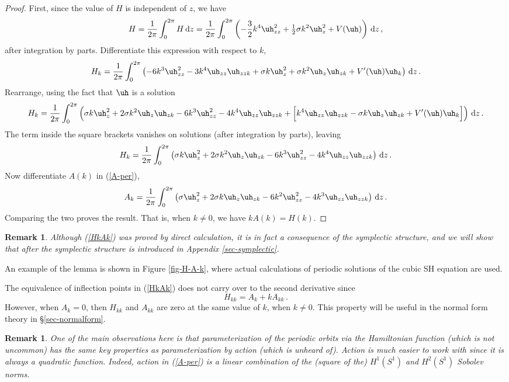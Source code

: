\documentclass[10pt]{article}
\newtheorem{rmk}[thm]{Remark}
\def\rd{{\rm d}} \def\re{{\rm e}} \def\fr{\mbox{$\frac{1}{2}$}}
\begin{document}
\begin{proof}
    First, since the value of $H$ is independent of $z$, we have
%
\begin{equation}\label{Hk-per}
H = \frac{1}{2\pi}\int_0^{2\pi} H\,\rd z =
\frac{1}{2\pi}\int_0^{2\pi} \left( -\frac{3}{2}k^4\uh_{zz}^2+
\fr\sigma k^2 \uh_{z}^2 + V(\uh)\right)\,\rd z \,,
\end{equation}
%
after integration by parts. Differentiate this expression with respect to $k$,
\[
H_k =
\frac{1}{2\pi}\int_0^{2\pi} \left( - 6k^3\uh_{zz}^2
-3k^4\uh_{zz}\uh_{zzk} +\sigma k \uh_{z}^2
+\sigma k^2 \uh_{z}\uh_{zk}+ V'(\uh)\uh_k\right)\,\rd z \,.
\]
Rearrange, using the fact that $\uh$ is a solution
\[
H_k =
\frac{1}{2\pi}\int_0^{2\pi} \left(\sigma k \uh_z^2
+2\sigma k^2 \uh_z\uh_{zk} - 6k^3\uh_{zz}^2 -4k^4\uh_{zz}\uh_{zzk}
+ \Big[k^4 \uh_{zz}\uh_{zzk}- \sigma k \uh_z\uh_{zk}
+ V'(\uh)\uh_k\Big]\right)\,\rd z \,.
\]
The term inside the square brackets vanishes on solutions (after integration by
parts), leaving
\[
H_k =
\frac{1}{2\pi}\int_0^{2\pi} \left(\sigma k \uh_z^2
+2\sigma k^2 \uh_z\uh_{zk} - 6k^3\uh_{zz}^2 -4k^4\uh_{zz}\uh_{zzk}
\right)\,\rd z\,.
\]
Now differentiate $A(k)$ in (\ref{A-per}),
\[
A_k = \frac{1}{2\pi}\int_0^{2\pi}\left(
\sigma \uh_z^2 + 2\sigma k \uh_z\uh_{zk} -6k^2\uh_{zz}^2 - 4k^3\uh_{zz}\uh_{zzk}\right)\,\rd z\,.
\]
Comparing the two proves the result. That is, when $k\neq0$, we have
$kA(k)=H(k)$.
\end{proof}

\begin{rmk} Although (\ref{HkAk}) was proved by direct calculation, it is in fact a
consequence of the symplectic structure, and we will show that after the
symplectic structure is introduced in Appendix \ref{sec-symplectic}.
\end{rmk}
%
An example of the lemma is shown in
Figure \ref{fig-H-A-k}, where actual calculations of periodic solutions of the cubic SH equation are used.

The equivalence of inflection points in (\ref{HkAk}) does not carry over to the second
derivative since
\[
H_{kk} = A_k + kA_{kk}\,.
\]
However, when $A_k=0$, then $H_{kk}$ and $A_{kk}$ are zero at the same value of
$k$, when $k\neq 0$. This property will be useful in the normal form theory in
\S\ref{sec-normalform}.

\begin{rmk}
One of the main observations here is that parameterization of the periodic
orbits via the Hamiltonian function (which is not uncommon) has the same key
properties as parameterization by action (which is unheard of).  Action is much
easier to work with since it is always a quadratic function.  Indeed, action in
(\ref{A-per}) is a linear combination of the (square of the) $H^1(S^1)$ and
$H^2(S^1)$ Sobolev norms.
\end{rmk}
\end{document}
